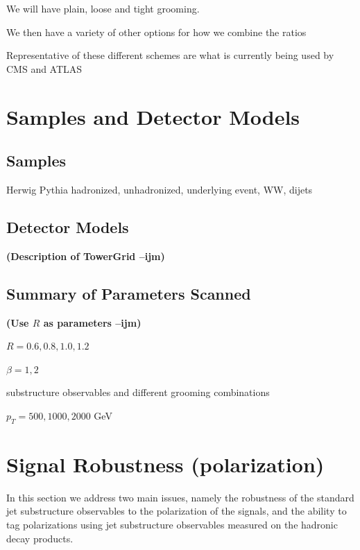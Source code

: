 \documentclass[11pt,letterpaper]{article}
\newcommand{\ijm}[1]{\textbf{\textcolor{llblue}{(#1 --ijm)}}}
\begin{document}
We will have plain, loose and tight grooming. 

We then have a variety of other options for how we combine the ratios


Representative of these different schemes are what is currently being used by CMS and ATLAS






\section{Samples and Detector Models}


\subsection{Samples}

Herwig Pythia hadronized, unhadronized, underlying event, WW, dijets


\subsection{Detector Models}

\ijm{Description of TowerGrid}


\subsection{Summary of Parameters Scanned}

\ijm{Use $R$ as parameters}

$R=0.6,0.8,1.0,1.2$

$\beta=1,2$

substructure observables and different grooming combinations

$p_T=500,1000,2000$ GeV

\section{Signal Robustness (polarization)}

In this section we address two main issues, namely the robustness of the standard jet substructure observables to the polarization of the signals, and the ability to tag polarizations using jet substructure observables measured on the hadronic decay products.
\end{document}
